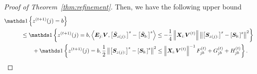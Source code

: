 \documentclass[lettersize,journal]{IEEEtran}
\theoremstyle{definition}
\theoremstyle{definition}
\newcommand{\off}[1]{\left[#1\right]}
\newcommand{\offf}[1]{\left\{#1\right\}}
\newcommand{\ang}[1]{\left\langle#1\right\rangle}
\def\fixme#1#2{\textbf{\color{red}[FIXME (#1): #2]}}
\begin{document}
\begin{proof}[Proof of Theorem~\ref{thm:refinement}]
    Then, we have the following upper bound 
    \begin{align}
         &\ind \offf{ z^{(t+1)}(j) = b  }\\ & \quad \quad \quad \leq \ind \offf{ z^{(t+1)}(j) = b ,   \ang{ \mE_{j:} \mV, \off{  \tilde \mS_{z(j):} }^s - \off{  \tilde \mS_{b:} }^s }  \leq - \frac{1}{4} \onorm{\mX_{i:} \mV^{(t)}} \onorm{ \off{ \mS_{z(j):}  }^s - \off{ \mS_{b:}  }^s  }^2 } \\
         & \quad \quad \quad  \quad \quad + \ind \offf{z^{(t+1)}(j) = b, \frac{1}{2}\onorm{ \off{ \mS_{z(j):}  }^s - \off{ \mS_{b:}  }^s  }^2 \leq \onorm{\mX_{i:} \mV^{(t)}}^{-1} F_{jb}^{(t)} + G_{jb}^{(t)} + H_{jb}^{(t)} }. \label{eq:ind_b}
    \end{align}
    

\end{proof}
\end{document}
